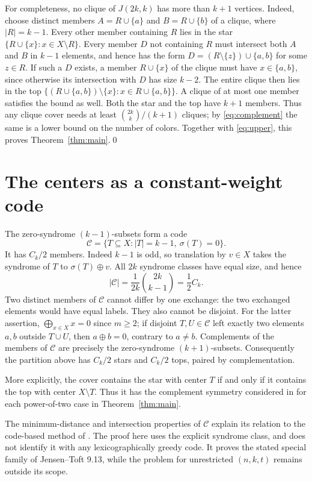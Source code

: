\documentclass[11pt]{article}
\newcommand{\calC}{\mathcal C}
\newcommand{\sig}{\sigma}
\begin{document}
For completeness, no clique of $J(2k,k)$ has more than $k+1$ vertices.  Indeed, choose distinct members $A=R\cup\{a\}$ and $B=R\cup\{b\}$ of a clique, where $|R|=k-1$.  Every other member containing $R$ lies in the star
$\{R\cup\{x\}:x\in X\setminus R\}$.  Every member $D$ not containing $R$ must intersect both $A$ and $B$ in $k-1$ elements, and hence has the form
$D=(R\setminus\{z\})\cup\{a,b\}$ for some $z\in R$.  If such a $D$ exists, a member $R\cup\{x\}$ of the clique must have $x\in\{a,b\}$, since otherwise its intersection with $D$ has size $k-2$.  The entire clique then lies in the top $\{(R\cup\{a,b\})\setminus\{x\}:x\in R\cup\{a,b\}\}$.  A clique of at most one member satisfies the bound as well.  Both the star and the top have $k+1$ members.  Thus any clique cover needs at least $\binom{2k}{k}/(k+1)$ cliques; by \eqref{eq:complement} the same is a lower bound on the number of colors.  Together with \eqref{eq:upper}, this proves Theorem~\ref{thm:main}.\qed

\section{The centers as a constant-weight code}
The zero-syndrome $(k-1)$-subsets form a code
\[
 \calC=\{T\subseteq X:|T|=k-1,\ \sig(T)=0\}.
\]
It has $C_k/2$ members.  Indeed $k-1$ is odd, so translation by $v\in X$ takes the syndrome of $T$ to $\sig(T)\oplus v$.  All $2k$ syndrome classes have equal size, and hence
\[
 |\calC|=\frac{1}{2k}\binom{2k}{k-1}
 =\frac{1}{2}C_k.
\]
Two distinct members of $\calC$ cannot differ by one exchange: the two exchanged elements would have equal labels.  They also cannot be disjoint.  For the latter assertion, $\bigoplus_{x\in X}x=0$ since $m\geq2$; if disjoint $T,U\in\calC$ left exactly two elements $a,b$ outside $T\cup U$, then $a\oplus b=0$, contrary to $a\ne b$.  Complements of the members of $\calC$ are precisely the zero-syndrome $(k+1)$-subsets.  Consequently the partition above has $C_k/2$ stars and $C_k/2$ tops, paired by complementation.

More explicitly, the cover contains the star with center $T$ if and only if it contains the top with center $X\setminus T$.  Thus it has the complement symmetry considered in \cite[Remark~4.17]{Jorgensen} for each power-of-two case in Theorem~\ref{thm:main}.

The minimum-distance and intersection properties of $\calC$ explain its relation to the code-based method of \cite{Jorgensen}.  The proof here uses the explicit syndrome class, and does not identify it with any lexicographically greedy code.  It proves the stated special family of Jensen--Toft 9.13, while the problem for unrestricted $(n,k,t)$ remains outside its scope.
\end{document}
